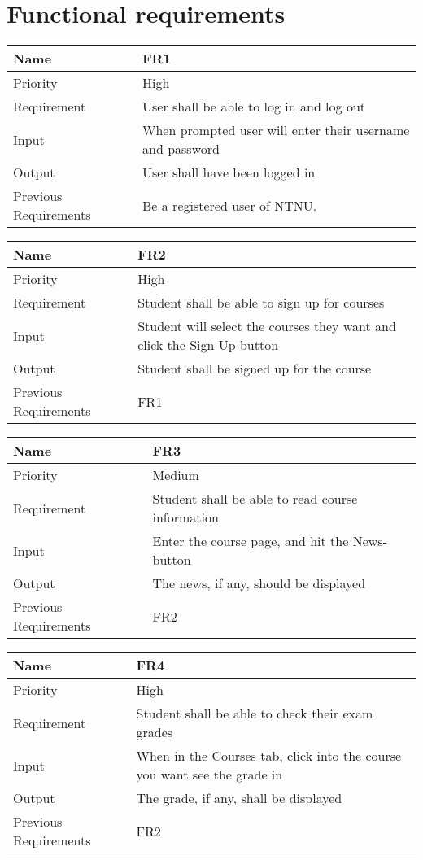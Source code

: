 \section{Functional requirements}

\begin{tabularx}{\textwidth}{|l|X|}
  \hline
  Name & FR1 \\ \hline
  Priority & High \\ \hline
  Requirement & User shall be able to log in and log out \\ \hline
  Input & When prompted user will enter their username and password \\ \hline
  Output & User shall have been logged in \\ \hline
  Previous Requirements & Be a registered user of NTNU. \\ \hline
\end{tabularx}

\begin{tabularx}{\textwidth}{|l|X|}
  \hline
  Name & FR2 \\ \hline
  Priority & High \\ \hline
  Requirement & Student shall be able to sign up for courses \\ \hline
  Input & Student will select the courses they want and click the Sign Up-button \\ \hline
  Output & Student shall be signed up for the course \\ \hline
  Previous Requirements & FR1 \\ \hline
\end{tabularx}

\begin{tabularx}{\textwidth}{|l|X|}
  \hline
  Name & FR3 \\ \hline
  Priority & Medium \\ \hline
  Requirement & Student shall be able to read course information \\ \hline
  Input & Enter the course page, and hit the News-button \\ \hline
  Output & The news, if any, should be displayed \\ \hline
  Previous Requirements & FR2 \\ \hline
\end{tabularx}

\begin{tabularx}{\textwidth}{|l|X|}
  \hline
  Name & FR4 \\ \hline
  Priority & High \\ \hline
  Requirement & Student shall be able to check their exam grades\\ \hline
  Input & When in the Courses tab, click into the course you want see the grade in \\ \hline
  Output & The grade, if any, shall be displayed \\ \hline
  Previous Requirements & FR2 \\ \hline
\end{tabularx}

